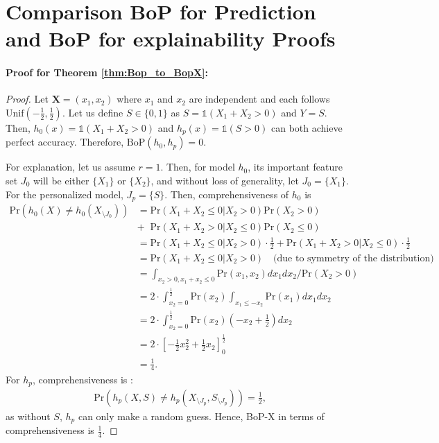 \section{Comparison BoP for Prediction and BoP for explainability Proofs}\label{sec:proof-counterexamples}

\paragraph{Proof for Theorem \ref{thm:Bop_to_BopX}:}
\begin{proof}
    Let $\mathbf{X} = (x_1, x_2)$ where $x_1$ and  $x_2$ are independent and each follows $\text{Unif}(-\frac{1}{2},\frac{1}{2})$. Let us define $S \in \{0, 1 \}$ as $S = \mathds{1}(X_1 + X_2 > 0) $ and $Y = S$. Then, $h_0(x) = \mathds{1}(X_1 + X_2 > 0) $ and $h_p(x) = \mathds{1}(S > 0) $ can both achieve perfect accuracy. Therefore, $\text{BoP}(h_0, h_p) = 0$. 

    For explanation, let us assume $r=1$. Then, for model $h_0$, its important feature set $J_0$ will be either $\{ X_1 \}$ or $\{ X_2 \}$, and without loss of generality, let $J_0 = \{ X_1 \}$. For the personalized model, $J_p = \{ S \}$. Then, comprehensiveness of $h_0$ is 
    \begin{align}
        \text{Pr}(h_0(X) \neq h_0(X_{\setminus J_0}) ) &= \text{Pr}(X_1 + X_2 \leq 0 | X_2 > 0) \text{Pr}(X_2 > 0) \nonumber \\
        &+ \;\; \text{Pr}(X_1 + X_2 > 0 | X_2 \leq 0) \text{Pr}(X_2 \leq 0) \label{eq:h0_comp} \\ 
        &= \text{Pr}(X_1 + X_2 \leq 0 | X_2 > 0) \cdot \frac{1}{2} + \text{Pr}(X_1 + X_2 > 0 | X_2 \leq 0) \cdot \frac{1}{2} \nonumber  \\ 
        &= \text{Pr}(X_1 + X_2 \leq 0 | X_2 > 0) \quad \text{(due to symmetry of the distribution)} \nonumber \\
        &= \int_{x_2 >0, x_1+x_2 \leq 0} \text{Pr}(x_1, x_2) dx_1 dx_2 \nonumber / \text{Pr} ( X_2 >0)\\
        &= 2 \cdot  \int_{x_2=0}^{\frac{1}{2}} \text{Pr}(x_2) \int_{x_1 \leq -x_2} \text{Pr}(x_1) dx_1 dx_2  \nonumber \\ 
        &= 2 \cdot  \int_{x_2=0}^{\frac{1}{2}} \text{Pr}(x_2) (-x_2+\frac{1}{2}) dx_2  \nonumber \\ 
         &= 2 \cdot \left[ -\frac{1}{2} x_2^2 + \frac{1}{2} x_2 \right]_{0}^{\frac{1}{2}} \nonumber \\ 
        &= \frac{1}{4}. \nonumber 
    \end{align}
    For $h_p$, comprehensiveness is : 
    \begin{align*}
        \text{Pr}(h_p(X,S) \neq h_p(X_{\setminus J_p}, S_{\setminus J_p}) ) = \frac{1}{2},
    \end{align*}
    as without $S$, $h_p$ can only make a random guess. Hence, BoP-X in terms of comprehensiveness is $\frac{1}{4}$. 


\end{proof}
